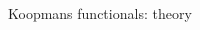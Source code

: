 \documentclass[xcolor=table,aspectratio=169]{beamer}
\numberwithin{equation}{section}
\begin{document}
\begin{frame}{Koopmans functionals: theory}
\begin{columns}
\begin{column}{0.4\textwidth}

\end{column}
\end{columns}
\end{frame}
\end{document}
